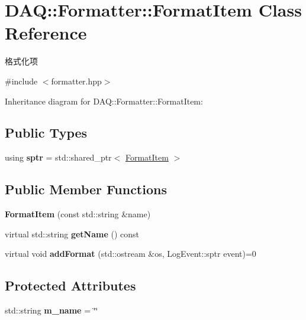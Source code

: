 \hypertarget{classDAQ_1_1Formatter_1_1FormatItem}{}\section{D\+AQ\+:\+:Formatter\+:\+:Format\+Item Class Reference}
\label{classDAQ_1_1Formatter_1_1FormatItem}


格式化项  




{\ttfamily \#include $<$formatter.\+hpp$>$}



Inheritance diagram for D\+AQ\+:\+:Formatter\+:\+:Format\+Item\+:
\subsection*{Public Types}
\begin{DoxyCompactItemize}
\item 
\mbox{\label{classDAQ_1_1Formatter_1_1FormatItem_adaf9d830f72420073044f69d2abf6431}} 
using {\bfseries sptr} = std\+::shared\+\_\+ptr$<$ \hyperlink{classDAQ_1_1Formatter_1_1FormatItem}{Format\+Item} $>$
\end{DoxyCompactItemize}
\subsection*{Public Member Functions}
\begin{DoxyCompactItemize}
\item 
\mbox{\label{classDAQ_1_1Formatter_1_1FormatItem_a40d746aebe0934c1730596c17939476b}} 
{\bfseries Format\+Item} (const std\+::string \&name)
\item 
\mbox{\label{classDAQ_1_1Formatter_1_1FormatItem_a4a69a6300e46d39a17ed9f74802bf240}} 
virtual std\+::string {\bfseries get\+Name} () const
\item 
\mbox{\label{classDAQ_1_1Formatter_1_1FormatItem_abbf11a24eb901769cd190b45f477a9c7}} 
virtual void {\bfseries add\+Format} (std\+::ostream \&os, Log\+Event\+::sptr event)=0
\end{DoxyCompactItemize}
\subsection*{Protected Attributes}
\begin{DoxyCompactItemize}
\item 
\mbox{\label{classDAQ_1_1Formatter_1_1FormatItem_a78b44d3700c4aa4ad3bb5751195cc6a9}} 
std\+::string {\bfseries m\+\_\+name} = \char`\"{}\char`\"{}
\end{DoxyCompactItemize}


